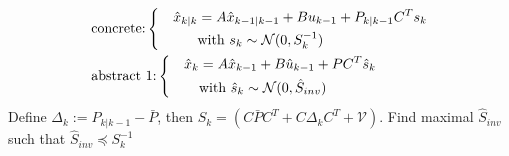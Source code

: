 \documentclass{ifacconf}
\begin{document}
\begin{align}
	&\text{concrete:}\left\{\begin{aligned}
		&&\hat x_{k|k}&=A\hat x_{k-1|k-1}+Bu_{k-1}+ P_{k|k-1} C^T  \relax{s}_k\notag \\
		&&&\mbox{with } \relax{s}_k\sim \mathcal{N} (0,S_k^{-1}) \notag 
	\end{aligned}\right.	\\
&		\text{abstract 1:}\left\{\begin{aligned}
		&&\hat x_k &=A\hat x_{k-1} +B\hat u_{k-1} + \relax P  C^T  \hat{s}_k\notag \\
		&&&\mbox{with } \hat{s}_k\sim \mathcal{N} (0,\hat{S}_{inv}) \notag 
	\end{aligned}\right.	
\end{align}
Define  $\Delta_k:=P_{k|k-1} -\bar P $,  then  $S_k=\left(C\bar PC^T+C\Delta_kC^T+\mathcal V\right)$.
Find maximal $\hat{S}_{inv}$ such that $\hat{S}_{inv}\preceq S_k^{-1}$
\end{document}

